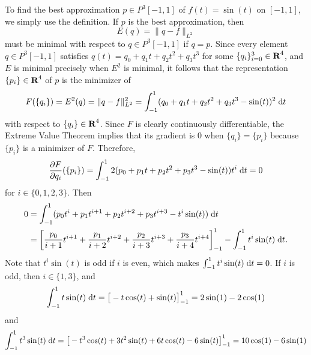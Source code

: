 \documentclass{homework}
\begin{document}
	\maketitle
	
	\question
	\begin{alphaparts}
		\questionpart To find the best approximation $p \in P^3[-1,1]$ of $f(t) = \sin(t)$ on $[-1,1]$, we simply use the definition. If $p$ is the best approximation, then
		\begin{equation}
			E(q) = \lVert q - f \rVert_{L^2}
		\end{equation}
		must be minimal with respect to $q \in P^3[-1,1]$ if $q = p$. Since every element $q \in P^3[-1,1]$ satisfies $q(t) = q_0 + q_1 t + q_2 t^2 + q_3t^3$ for some $\{q_i\}_{i=0}^3 \in \textbf{R}^4$, and $E$ is minimal precisely when $E^2$ is minimal, it follows that the representation $\{p_i\} \in \textbf{R}^4$ of $p$ is the minimizer of
		\begin{equation}
			\label{eq:integral_error}
			F(\{q_i\}) = E^2(q) = \lVert q- f\rVert_{L^2}^2 = \int_{-1}^1(q_0 + q_1t + q_2t^2 + q_3 t^3 - \sin(t))^2\;\text{d} t
		\end{equation}
		with respect to $\{q_i\} \in \textbf{R}^4$. Since $F$ is clearly continuously differentiable, the Extreme Value Theorem implies that its gradient is 0 when $\{q_i\} = \{p_i\}$ because $\{p_i\}$ is a minimizer of $F$. Therefore,
		\begin{equation}
			\frac{\partial F}{\partial q_i}(\{p_i\}) = \int_{-1}^12(p_0+p_1t + p_2t^2 + p_3t^3 - \sin(t))t^i\;\text{d} t = 0
		\end{equation}
		for $i \in \{0,1,2,3\}$. Then
		\begin{align}
			0 &= \int_{-1}^1(p_0t^i + p_1t^{i+1} + p_2t^{i+2} + p_3t^{i+3} - t^i\sin(t))\;\text{d} t \\
			\label{eq:gradient}
			&= \left[\frac{p_0}{i+1}t^{i+1} + \frac{p_1}{i+2}t^{i+2} + \frac{p_2}{i+3}t^{i+3} + \frac{p_3}{i+4}t^{i+4}\right]_{-1}^1 - \int_{-1}^1 t^i \sin(t)\;\text{d} t.
		\end{align}
		Note that $t^i\sin(t)$ is odd if $i$ is even, which makes $\int_{-1}^1t^{i}\sin(t)\;\text{d} t = 0$. If $i$ is odd, then $i \in \{1,3\}$, and
		\begin{equation}
			\int_{-1}^1 t\sin(t)\;\text{d} t = \big[-t\cos(t) + \sin(t)\big]_{-1}^1 = 2\sin(1)-2\cos(1)
		\end{equation}
		and
		\begin{equation}
			\int_{-1}^1 t^3\sin(t)\;\text{d} t = \big[-t^3\cos(t) +3t^2\sin(t) + 6t\cos(t) - 6\sin(t)\big]_{-1}^1 = 10\cos(1) -6\sin(1)
		\end{equation}

\end{alphaparts}
\end{document}
